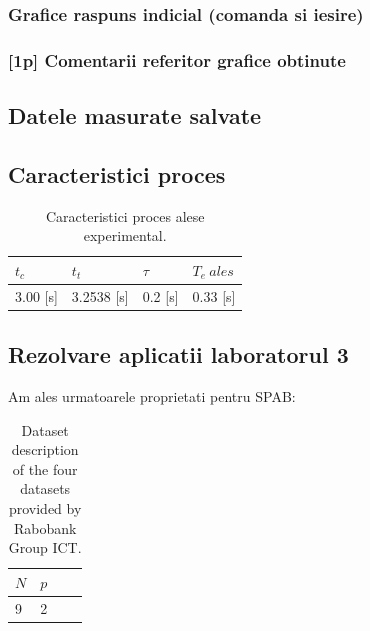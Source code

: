 \documentclass[12pt,english]{article}
\begin{document}
\subsubsection {Grafice raspuns indicial (comanda si iesire) }
	\begin{center}
	\end{center}

\subsubsection {[1p] Comentarii referitor grafice obtinute }
\subsection {Datele masurate salvate }
\subsection {Caracteristici proces }
\begin{table}[H]
  \centering
  \begin{tabular}{|l|l|l|l|}
    \hline
    $t_c$ & $t_t$ & $\tau$ & $T_e\ ales$ \\
    \hline
    3.00 [s] & 3.2538 [s] & 0.2 [s] & 0.33 [s] \\
    \hline
  \end{tabular}
  \caption{Caracteristici proces alese experimental.}
\end{table}

\subsection {Rezolvare aplicatii laboratorul 3 }
Am ales urmatoarele proprietati pentru SPAB:
\begin{table}[h!]
  \centering
    \begin{tabular}{|l|l|l|l|}
      \hline
      $N$ & $p$ \\
      \hline
      9 & 2 \\
      \hline
    \end{tabular}
    \caption{Dataset description of the four datasets provided by Rabobank Group ICT.}
\end{table}
\end{document}
